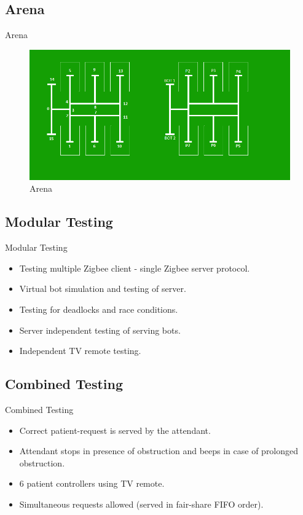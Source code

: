 \documentclass{beamer}
\begin{document}
\subsection{Arena}
\begin{frame}{Arena}
\begin{figure}
\centerline{\includegraphics[scale=0.45]{Arena.png}}
\caption{Arena}\label{fig:exp}
\end{figure}
\end{frame}

\subsection{Modular Testing}
\begin{frame}{Modular Testing}
\begin{itemize}
\item Testing multiple Zigbee client - single Zigbee server protocol.
\item Virtual bot simulation and testing of server.
\item Testing for deadlocks and race conditions.
\item Server independent testing of serving bots.
\item Independent TV remote testing.
\end{itemize}
\end{frame}

\subsection{Combined Testing}
\begin{frame}{Combined Testing}
\begin{itemize} 
\item Correct patient-request is served by the attendant.
\item Attendant stops in presence of obstruction and beeps in case of prolonged obstruction.
\item 6 patient controllers using TV remote.
\item Simultaneous requests allowed (served in fair-share FIFO order).
\end{itemize}
\end{frame}
\end{document}
